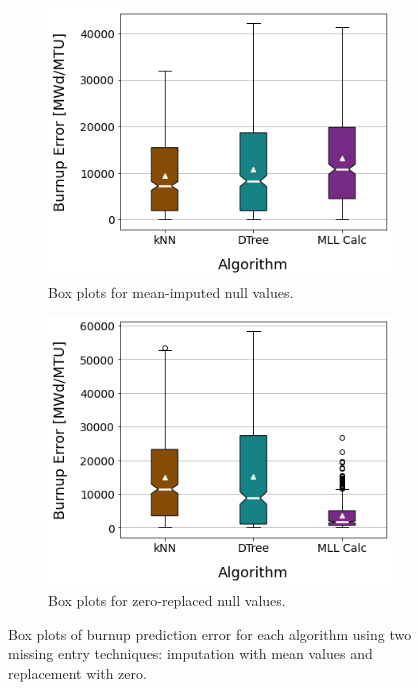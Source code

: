 \begin{figure}[!htb]
  \centering
  \begin{subfigure}[b]{0.49\textwidth}
    \centering
    \includegraphics[width=\textwidth]{./chapters/exp1/sfcompo_boxplots_impnull_burn.png}
    \caption{Box plots for mean-imputed null values.}
    \label{fig:burnimp}
  \end{subfigure}
  \hfill
  \begin{subfigure}[b]{0.49\textwidth}
    \centering
    \includegraphics[width=\textwidth]{./chapters/exp1/sfcompo_boxplots_0null_burn.png}
    \caption{Box plots for zero-replaced null values.}
    \label{fig:burn0}
  \end{subfigure}
  \caption{Box plots of burnup prediction error for each algorithm 
           using two missing entry techniques: imputation with mean values 
           and replacement with zero.}
  \label{fig:sfcoburn}
\end{figure}

